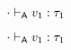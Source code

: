 {\begin{lamportproof*}
    \begin{pfproof}
      \absurdstep
        \begin{pfproof}
          ${\cdot} \vdash_{\mathsf{A}} v_1 : \tau_1$
        \end{pfproof}
    \end{pfproof}

    \begin{pfproof}
      \absurdstep
        \begin{pfproof}
          ${\cdot} \vdash_{\mathsf{A}} v_1 : \tau_1$
        \end{pfproof}
    \end{pfproof}


\end{lamportproof*}}
